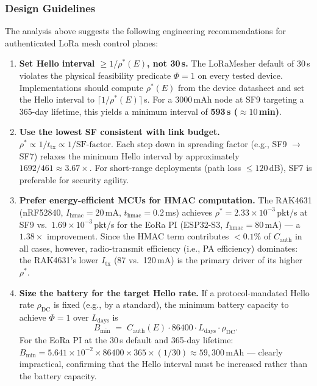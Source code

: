\subsubsection{Design Guidelines}
\label{subsubsec:design-guidelines}

The analysis above suggests the following engineering recommendations for
authenticated LoRa mesh control planes:

\begin{enumerate}[label=\textbf{DG\arabic*.}]

  \item \textbf{Set Hello interval $\ge 1/\rho^*(E)$, not 30\,s.}\;
        The LoRaMesher default of 30\,s violates the physical feasibility
        predicate $\Phi = 1$ on every tested device.  Implementations should
        compute $\rho^*(E)$ from the device datasheet and set the Hello
        interval to $\lceil 1/\rho^*(E) \rceil$\,s.  For a 3000\,mAh node
        at SF9 targeting a 365-day lifetime, this yields a minimum interval
        of \textbf{593\,s ($\approx 10$\,min)}.

  \item \textbf{Use the lowest SF consistent with link budget.}\;
        $\rho^* \propto 1/t_{\mathrm{tx}} \propto 1/\mathrm{SF\text{-}factor}$.
        Each step down in spreading factor (e.g., SF9 $\to$ SF7) relaxes the
        minimum Hello interval by approximately $1692/461 \approx 3.67\times$.
        For short-range deployments (path loss $\le 120$\,dB), SF7 is
        preferable for security agility.

  \item \textbf{Prefer energy-efficient MCUs for HMAC computation.}\;
        The RAK4631 (nRF52840, $I_{\mathrm{hmac}} = 20$\,mA,
        $t_{\mathrm{hmac}} = 0.2$\,ms) achieves $\rho^* = 2.33 \times 10^{-3}$\,pkt/s
        at SF9 vs.\ $1.69 \times 10^{-3}$\,pkt/s for the EoRa PI (ESP32-S3,
        $I_{\mathrm{hmac}} = 80$\,mA) — a $1.38\times$ improvement.  Since
        the HMAC term contributes $< 0.1\%$ of $C_{\mathrm{auth}}$ in all
        cases, however, radio-transmit efficiency (i.e., PA efficiency)
        dominates: the RAK4631's lower $I_{\mathrm{tx}}$ (87 vs.\ 120\,mA)
        is the primary driver of its higher $\rho^*$.

  \item \textbf{Size the battery for the target Hello rate.}\;
        If a protocol-mandated Hello rate $\rho_{\mathrm{DC}}$ is fixed
        (e.g., by a standard), the minimum battery capacity to achieve
        $\Phi = 1$ over $L_{\mathrm{days}}$ is
        \[
          B_{\min}
          \;=\; C_{\mathrm{auth}}(E) \cdot 86400 \cdot L_{\mathrm{days}} \cdot \rho_{\mathrm{DC}}.
        \]
        For the EoRa PI at the 30\,s default and 365-day lifetime:
        $B_{\min} = 5.641 \times 10^{-2} \times 86400 \times 365 \times (1/30)
        \approx 59{,}300$\,mAh — clearly impractical, confirming that the
        Hello interval must be increased rather than the battery capacity.


\end{enumerate}
